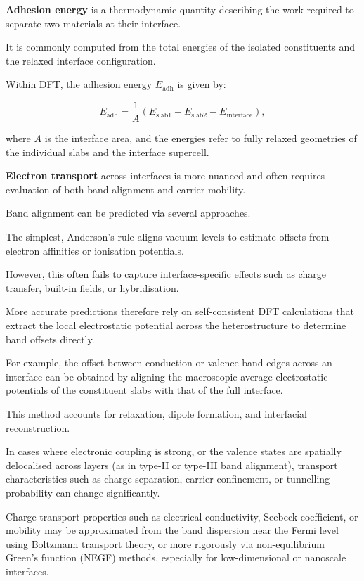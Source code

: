 
\textbf{Adhesion energy} is a thermodynamic quantity describing the work required to separate two materials at their
interface\nocite{}.

It is commonly computed from the total energies of the isolated constituents and the relaxed interface configuration\nocite{}.

Within DFT, the adhesion energy $E_\mathrm{adh}$ is given by\nocite{}:

\[ E_\mathrm{adh} = \frac{1}{A} \left( E_\mathrm{slab1} + E_\mathrm{slab2} - E_\mathrm{interface} \right), \]

where $A$ is the interface area, and the energies refer to fully relaxed geometries of the individual slabs and the
interface supercell\nocite{}.




\textbf{Electron transport} across interfaces is more nuanced and often requires evaluation of both band alignment and
carrier mobility.

Band alignment can be predicted via several approaches.

The simplest, Anderson's rule aligns vacuum levels to estimate offsets from electron affinities or ionisation
potentials.

However, this often fails to capture interface-specific effects such as charge transfer, built-in fields, or
hybridisation.

More accurate predictions therefore rely on self-consistent DFT calculations that extract the local electrostatic
potential across the heterostructure to determine band offsets directly.


For example, the offset between conduction or valence band edges across an interface can be obtained by aligning the
macroscopic average electrostatic potentials of the constituent slabs with that of the full interface.

This method accounts for relaxation, dipole formation, and interfacial reconstruction.

In cases where electronic coupling is strong, or the valence states are spatially delocalised across layers (as in
type-II or type-III band alignment), transport characteristics such as charge separation, carrier confinement, or
tunnelling probability can change significantly.


Charge transport properties such as electrical conductivity, Seebeck coefficient, or mobility may be
approximated from the band dispersion near the Fermi level using Boltzmann transport theory, or more rigorously via
non-equilibrium Green's function (NEGF) methods, especially for low-dimensional or nanoscale interfaces.


